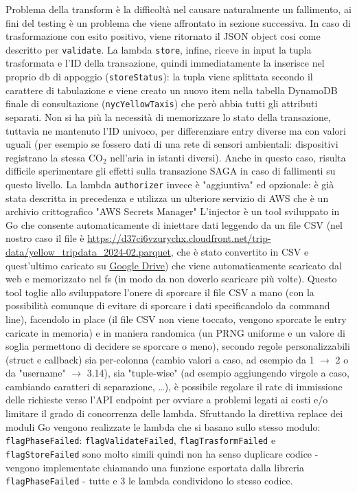 \documentclass[
    sigconf, 
    screen=false, 
    acmthm=false, 
    nonacm
]{acmart}
\begin{document}
Problema della transform è la difficoltà nel causare naturalmente un fallimento, ai fini del testing è un problema
che viene affrontato in sezione successiva.
In caso di trasformazione con esito positivo, viene ritornato il JSON object cosi come descritto per 
\texttt{validate}.
La lambda \texttt{store}, infine, riceve in input la tupla trasformata e l'ID della transazione, quindi immediatamente la
inserisce nel proprio db di appoggio (\texttt{storeStatus}): la tupla viene splittata secondo il carattere di tabulazione e viene creato
un nuovo item nella tabella DynamoDB finale di consultazione (\texttt{nycYellowTaxis}) che però abbia tutti gli attributi separati. Non si
ha più la necessità di memorizzare lo stato della transazione, tuttavia ne mantenuto l'ID univoco,
per differenziare entry diverse ma con valori uguali (per esempio se fossero dati di una rete di sensori 
ambientali: dispositivi registrano la stessa CO$_2$
nell'aria in istanti diversi). Anche in questo caso, risulta difficile sperimentare gli effetti sulla transazione
SAGA in caso di fallimenti su questo livello.
La lambda \texttt{authorizer} invece è "aggiuntiva" ed opzionale: è già stata descritta in precedenza e utilizza un ulteriore
servizio di AWS che è un archivio crittografico "AWS Secrets Manager" \cite{awssm}
L'injector è un tool sviluppato in Go che consente automaticamente di iniettare dati leggendo da un file CSV (nel 
nostro caso il file è \url{https://d37ci6vzurychx.cloudfront.net/trip-data/yellow_tripdata_2024-02.parquet}, che è stato 
convertito in CSV e quest'ultimo caricato su \href{https://drive.usercontent.google.com/download?id=1mqkh5NOnXcPbMaDtlQwbqAohh2hmwD9A&export=download&authuser=0&confirm=t&uuid=fc50597e-78ae-4f42-9826-1e55c744a0c9&at=APZUnTWrIFMIwKMOGG0qEad3rbJo%3A1719409476696}{Google Drive}) che viene automaticamente scaricato dal web e memorizzato nel fs (in modo da non doverlo 
scaricare più volte). Questo tool toglie allo sviluppatore l'onere di sporcare il file CSV a mano (con la 
possibilità comunque di evitare di sporcare i dati specificandolo da command line), facendolo in place (il file CSV non viene toccato, vengono sporcate le entry caricate in memoria) e in maniera randomica (un PRNG 
uniforme e un valore di soglia permettono di decidere se sporcare o meno), secondo regole personalizzabili (struct e callback) sia per-colonna (cambio valori 
a caso, ad esempio da 1 $\rightarrow$ 2 o da "username" $\rightarrow$ 3.14), sia "tuple-wise" (ad esempio 
aggiungendo virgole a caso, cambiando caratteri di separazione, \dots), è possibile regolare il rate di immissione
delle richieste verso l'API endpoint per ovviare a problemi legati ai costi e/o limitare il grado di concorrenza
delle lambda.
Sfruttando la direttiva replace dei moduli Go \cite{gomodreplace} vengono realizzate le lambda che si basano sullo stesso modulo: \texttt{flagPhaseFailed}:
\texttt{flagValidateFailed}, \texttt{flagTrasformFailed} e \texttt{flagStoreFailed} sono molto simili quindi non ha senso duplicare codice -
vengono implementate chiamando una funzione esportata dalla libreria \texttt{flagPhaseFailed} - tutte e 3 le lambda condividono lo stesso codice.
\end{document}
